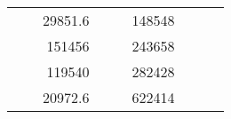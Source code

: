 \begin{table}[H]
\begin{tabular}{|ccrccrccc}
\multicolumn{1}{|c|}{\cellcolor[HTML]{FFFFC7}}                                & \multicolumn{1}{c|}{\cellcolor[HTML]{DDFDFF}}                      & \multicolumn{1}{r|}{\cellcolor[HTML]{DAE8FC}29851.6}   & \multicolumn{1}{c|}{\cellcolor[HTML]{FFFFC7}}                                & \multicolumn{1}{c|}{\cellcolor[HTML]{DDFDFF}}                       & \multicolumn{1}{r|}{\cellcolor[HTML]{DDFDFF}148548}    &                                                                              &                                                                    &                                                        \\ \cline{3-3} \cline{6-6}
\multicolumn{1}{|c|}{\cellcolor[HTML]{FFFFC7}}                                & \multicolumn{1}{c|}{\cellcolor[HTML]{DDFDFF}}                      & \multicolumn{1}{r|}{\cellcolor[HTML]{DDFDFF}151456}    & \multicolumn{1}{c|}{\cellcolor[HTML]{FFFFC7}}                                & \multicolumn{1}{c|}{\cellcolor[HTML]{DDFDFF}}                       & \multicolumn{1}{r|}{\cellcolor[HTML]{DAE8FC}243658}    &                                                                              &                                                                    &                                                        \\ \cline{3-3} \cline{6-6}
\multicolumn{1}{|c|}{\cellcolor[HTML]{FFFFC7}}                                & \multicolumn{1}{c|}{\cellcolor[HTML]{DDFDFF}}                      & \multicolumn{1}{r|}{\cellcolor[HTML]{DAE8FC}119540}    & \multicolumn{1}{c|}{\cellcolor[HTML]{FFFFC7}}                                & \multicolumn{1}{c|}{\cellcolor[HTML]{DDFDFF}}                       & \multicolumn{1}{r|}{\cellcolor[HTML]{DDFDFF}282428}    &                                                                              &                                                                    &                                                        \\ \cline{3-3} \cline{6-6}
\multicolumn{1}{|c|}{\cellcolor[HTML]{FFFFC7}}                                & \multicolumn{1}{c|}{\cellcolor[HTML]{DDFDFF}}                      & \multicolumn{1}{r|}{\cellcolor[HTML]{DDFDFF}20972.6}   & \multicolumn{1}{c|}{\cellcolor[HTML]{FFFFC7}}                                & \multicolumn{1}{c|}{\cellcolor[HTML]{DDFDFF}}                       & \multicolumn{1}{r|}{\cellcolor[HTML]{DAE8FC}622414}    &                                                                              &                                                                    &                                                        \\ \cline{3-3} \cline{6-6}

\end{tabular}
\end{table}
